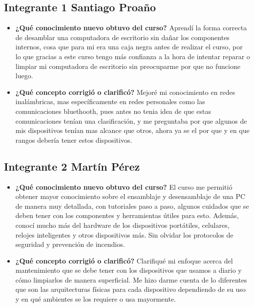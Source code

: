 \documentclass{article}
\begin{document}
\subsection{Integrante 1 Santiago Proaño}
\label{sec:orgece2a4b}
\begin{itemize}
\item \textbf{¿Qué conocimiento nuevo obtuvo del curso?} Aprendí la forma correcta de desamblar una computadora de escritorio sin dañar los componentes internos, cosa que para mi era una caja negra antes de realizar el curso, por lo que gracias a este curso tengo más confianza a la hora de intentar reparar o limpiar mi computadora de escritorio sin preocuparme por que no funcione luego.
\item \textbf{¿Qué concepto corrigió o clarificó?} Mejoré mi conocimiento en redes inalámbricas, mas específicamente en redes personales como las comunicaciones bluethooth, pues antes no tenia idea de que estas comunicaciones tenían una clasificación, y me preguntaba por que algunos de mis dispositivos tenían mas alcance que otros, ahora ya se el por que y en que rangos debería tener estos dispositivos.
\end{itemize}

\subsection{Integrante 2  Martín Pérez}
\label{sec:org64330f2}
\begin{itemize}
\item \textbf{¿Qué conocimiento nuevo obtuvo del curso?} El curso me permitió obtener mayor conocimiento sobre el ensamblaje y desensamblaje de una PC de manera muy detallada, con tutoriales paso a paso, algunos cuidados que se deben tener con los componentes y herramientas útiles para esto. Además, conocí mucho más del hardware de los dispositivos portátiles, celulares, relojes inteligentes y otros dispositivos más. Sin olvidar los protocolos de seguridad y prevención de incendios.
\item \textbf{¿Qué concepto corrigió o clarificó?} Clarifiqué mi enfoque acerca del mantenimiento que se debe tener con los dispositivos que usamos a diario y cómo limpiarlos de manera superficial. Me hizo darme cuenta de lo diferentes que son las arquitecturas físicas para cada dispositivo dependiendo de su uso y en qué ambientes se los requiere o usa mayormente.
\end{itemize}
\end{document}
